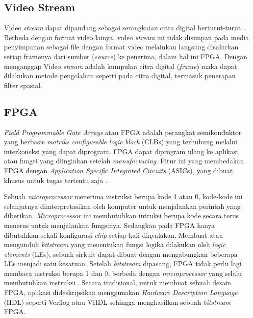 \subsection{Video Stream}
Video \textit{stream} dapat dipandang sebagai serangkaian citra digital berturut-turut \cite{thesis:jin}. Berbeda dengan format video lainya, video \textit{stream} ini tidak disimpan pada media penyimpanan sebagai file dengan format video melainkan langsung disalurkan setiap framenya dari sumber (\textit{source}) ke penerima, dalam hal ini FPGA.  Dengan menganggap Video \textit{stream} adalah kumpulan citra digital (\textit{frame}) maka dapat dilakukan metode pengolahan seperti pada citra digital, termasuk penerapan filter spasial. 


\subsection{FPGA}
\textit{Field Programmable Gate Arrays} atau FPGA adalah perangkat semikonduktor yang berbasis \textit{matriks configurable logic block} (CLBs) yang terhubung melalui interkoneksi yang dapat diprogram. FPGA dapat diprogram ulang ke aplikasi atau fungsi yang diinginkan setelah \textit{manufacturing}. Fitur ini yang membedakan FPGA dengan \textit{Application Specific Integrated Circuits} (ASICs), yang dibuat khusus untuk tugas tertentu saja \cite{XILINX}.

Sebuah \textit{microprocessor} menerima instruksi berupa kode 1 atau 0, kode-kode ini selanjutnya diinterpretasikan oleh komputer untuk menjalankan perintah yang diberikan. \textit{Microprocessor} ini membutuhkan intruksi berupa kode secara terus menerus untuk menjalankan fungsinya. Sedangkan pada FPGA hanya dibutuhkan sekali konfigurasi \textit{chip} setiap kali dinyalakan. Membuat atau mengunduh \textit{bitstream} yang menentukan fungsi logika dilakukan oleh \textit{logic elements} (LEs), sebuah sirkuit dapat dibuat dengan mengabungkan beberapa LEs menjadi satu kesatuan. Setelah \textit{bitstream} dipasang, FPGA tidak perlu lagi membaca instruksi berupa 1 dan 0, berbeda dengan \textit{microprocessor} yang selalu membutuhkan instruksi \cite{pdf:cheung}. Secara tradisional, untuk membuat sebuah desain FPGA, aplikasi dideskripsikan menggunakan \textit{Hardware Description Language} (HDL) seperti Verilog atau VHDL sehingga menghasilkan sebuah \textit{bitstream} FPGA. 

